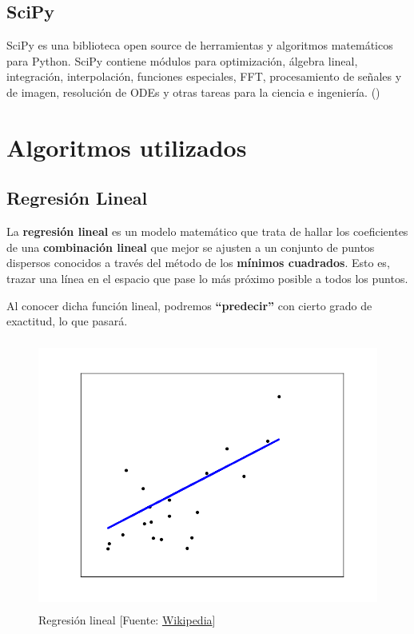 	\subsection{SciPy}
	\label{makereference4.2.3}
	SciPy es una biblioteca open source de herramientas y algoritmos matemáticos para Python. SciPy contiene módulos para optimización, álgebra lineal, integración, interpolación, funciones especiales, FFT, procesamiento de señales y de imagen, resolución de ODEs y otras tareas para la ciencia e ingeniería. (\cite{ARP:Scipy:2017})
	
\section{Algoritmos utilizados}
\label{makereference4.3}
	\subsection{Regresión Lineal}
	\label{makereference4.3.1}

	La \textbf{regresión lineal} es un modelo matemático que trata de hallar los coeficientes de una \textbf{combinación lineal} que mejor se ajusten a un conjunto de puntos dispersos conocidos a través del método de los \textbf{mínimos cuadrados}. Esto es, trazar una línea en el espacio que pase lo más próximo posible a todos los puntos.

	Al conocer dicha función lineal, podremos \textbf{``predecir''} con cierto grado de exactitud, lo que pasará.

	\begin{figure}[htb]
		
		\begin{center}
			\includegraphics[height=3.5in]{figures/regression.png}
			\caption{Regresión lineal [Fuente: \href{www.wikipedia.org}{Wikipedia}]}
		\end{center}
		
		\label{regression}
	\end{figure}
	
